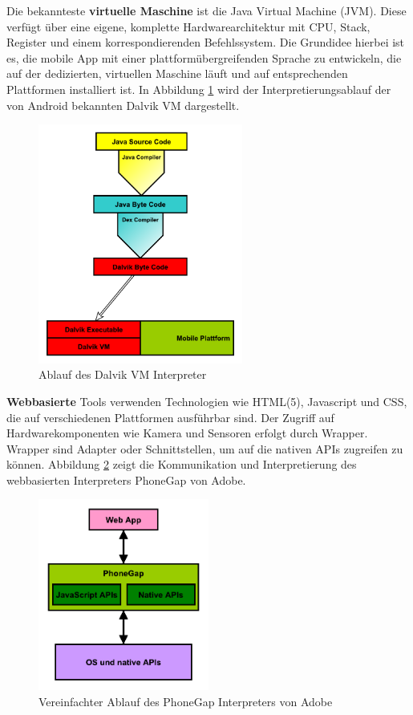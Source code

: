 Die bekannteste \textbf{virtuelle Maschine} ist die Java Virtual Machine (JVM). Diese verfügt über eine eigene, komplette Hardwarearchitektur mit CPU, Stack, Register und einem korrespondierenden Befehlssystem. Die Grundidee hierbei ist es, die mobile App mit einer plattformübergreifenden Sprache zu entwickeln, die auf der dedizierten, virtuellen Maschine läuft und auf entsprechenden Plattformen installiert ist. In Abbildung \ref{graph_interpreter_Dalvik} wird der Interpretierungsablauf der von Android bekannten Dalvik VM dargestellt.

\begin{figure}[htbp]
	\centering
	\includegraphics[width=0.6\textwidth]{Bilder/Interpretation_VM_Dalvik}
	\caption{Ablauf des Dalvik VM Interpreter}\label{graph_interpreter_Dalvik}
\end{figure}

\bigskip
\textbf{Webbasierte} Tools verwenden Technologien wie HTML(5), Javascript und CSS, die auf verschiedenen Plattformen ausführbar sind. Der Zugriff auf Hardwarekomponenten wie Kamera und Sensoren erfolgt durch Wrapper. Wrapper sind Adapter oder Schnittstellen, um auf die nativen APIs zugreifen zu können. Abbildung \ref{graph_interpreter_PhoneGap} zeigt die Kommunikation und Interpretierung des webbasierten Interpreters PhoneGap von Adobe.

\begin{figure}[htbp]
	\centering
	\includegraphics[width=0.5\textwidth]{Bilder/Interpretation_Web_PhoneGap}
	\caption{Vereinfachter Ablauf des PhoneGap Interpreters von Adobe}\label{graph_interpreter_PhoneGap}
\end{figure} 

